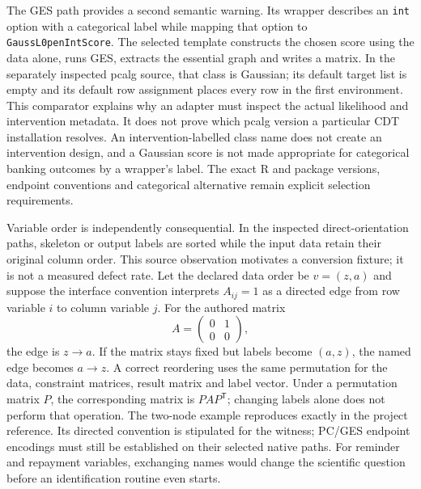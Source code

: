 The GES path provides a second semantic warning. Its wrapper describes an \texttt{int} option
with a categorical label while mapping that option to \texttt{GaussL0penIntScore}. The selected
template constructs the chosen score using the data alone, runs GES, extracts the essential
graph and writes a matrix. In the separately inspected pcalg source, that class is Gaussian;
its default target list is empty and its default row assignment places every row in the first
environment. This comparator explains why an adapter must inspect the actual likelihood and
intervention metadata. It does not prove which pcalg version a particular CDT installation
resolves. An intervention-labelled class name does not create an intervention design, and a
Gaussian score is not made appropriate for categorical banking outcomes by a wrapper's label.
The exact R and package versions, endpoint conventions and categorical alternative remain
explicit selection requirements.~\citep{exec28_bp_cdt}

Variable order is independently consequential. In the inspected direct-orientation paths,
skeleton or output labels are sorted while the input data retain their original column order.
This source observation motivates a conversion fixture; it is not a measured defect rate.
Let the declared data order be $v=(z,a)$ and suppose the interface convention interprets
$A_{ij}=1$ as a directed edge from row variable $i$ to column variable $j$. For the authored matrix
\[
 A=\begin{pmatrix}0&1\\0&0\end{pmatrix},
\]
the edge is $z\to a$. If the matrix stays fixed but labels become $(a,z)$, the named edge becomes
$a\to z$. A correct reordering uses the same permutation for the data, constraint matrices,
result matrix and label vector. Under a permutation matrix $P$, the corresponding matrix is
$PAP^{\mathsf T}$; changing labels alone does not perform that operation. The two-node example
reproduces exactly in the project reference. Its directed convention is stipulated for the
witness; PC/GES endpoint encodings must still be established on their selected native paths.
For reminder and repayment variables, exchanging names would change the scientific question
before an identification routine even starts.~\citep{exec28_bp_reference,exec28_bp_cdt}

